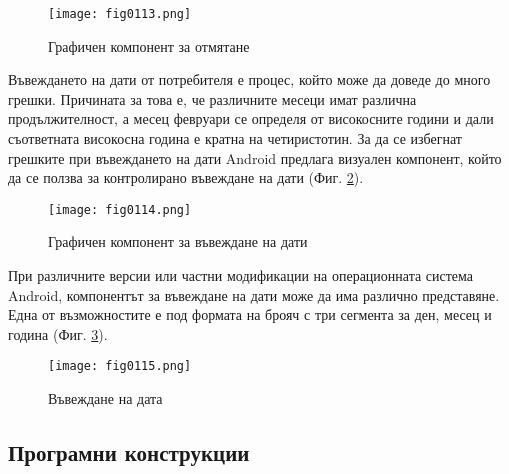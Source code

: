 \begin{figure}[H]
  \centering
  \texttt{[image: fig0113.png]}
  \caption{Графичен компонент за отмятане}
\label{fig0113}
\end{figure}

Въвеждането на дати от потребителя е процес, който може да доведе до много грешки. Причината за това е, че различните месеци имат различна продължителност, а месец февруари се определя от високосните години и дали съответната високосна година е кратна на четиристотин. За да се избегнат грешките при въвеждането на дати Android предлага визуален компонент, който да се ползва за контролирано въвеждане на дати (Фиг. \ref{fig0114}).

\begin{figure}[H]
  \centering
  \texttt{[image: fig0114.png]}
  \caption{Графичен компонент за въвеждане на дати}
\label{fig0114}
\end{figure}

При различните версии или частни модификации на операционната система Android, компонентът за въвеждане на дати може да има различно представяне. Една от възможностите е под формата на брояч с три сегмента за ден, месец и година (Фиг. \ref{fig0115}).

\begin{figure}[H]
  \centering
  \texttt{[image: fig0115.png]}
  \caption{Въвеждане на дата}
\label{fig0115}
\end{figure}

\subsection{Програмни конструкции}

